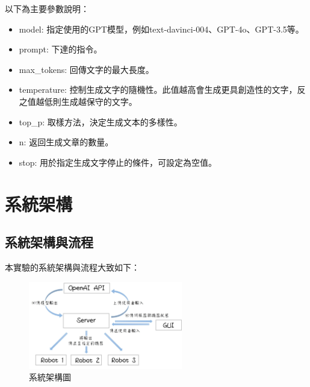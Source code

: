 \documentclass[class=NCU_thesis, crop=false]{standalone}
\begin{document}
以下為主要參數說明：
\begin{itemize}
    \item model: 指定使用的GPT模型，例如text-davinci-004、GPT-4o、GPT-3.5等。
    \item prompt: 下達的指令。
    \item max\_tokens: 回傳文字的最大長度。
    \item temperature: 控制生成文字的隨機性。此值越高會生成更具創造性的文字，反之值越低則生成越保守的文字。
    \item top\_p: 取樣方法，決定生成文本的多樣性。
    \item n: 返回生成文章的數量。
    \item stop: 用於指定生成文字停止的條件，可設定為空值。
\end{itemize}
\newpage

\section{系統架構}
\subsection{系統架構與流程}
本實驗的系統架構與流程大致如下：

\begin{figure}[h]
    \centering
    \includegraphics[width=0.6\textwidth]{figures/structure.jpg}
    \caption{系統架構圖}
\end{figure}
\end{document}
